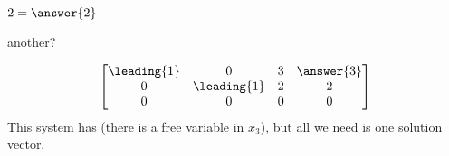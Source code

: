 \documentclass{ximera}
\begin{document}
\begin{example}
  $2 = \answer{2}$

  \begin{question}
    \begin{multipleChoice}
    \end{multipleChoice}

    \begin{feedback}[correct]
      another?
      \begin{multipleChoice}
      \end{multipleChoice} 
    \end{feedback}
  \end{question}

  \begin{question}
    \[
      \begin{bmatrix}
        \leading{1} & 0 & 3 & \answer{3}\\
        0 & \leading{1} & 2 & 2\\
        0 & 0 & 0 & 0
      \end{bmatrix}
    \]
    This system has  (there is a free
    variable in $x_3$), but all we need is one solution vector.

    \begin{multipleChoice}
    \end{multipleChoice} 
  \end{question}
\end{example}
\end{document}
